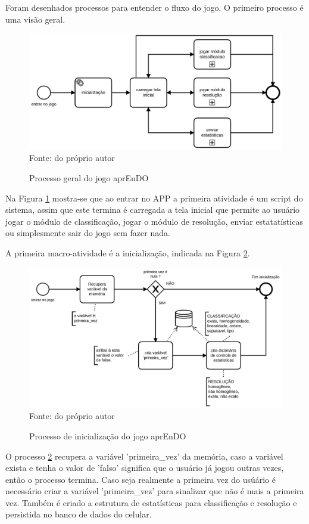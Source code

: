 Foram desenhados processos para entender o fluxo do jogo. O primeiro processo é uma visão geral.

\begin{figure}[H]
\centering
\caption{Processo geral do jogo aprEnDO}
\includegraphics[scale=0.2]{figuras/processos/processo_geral.png}
\label{pg}
\\
\small{Fonte: do próprio autor}
\end{figure}

Na Figura \ref{pg} mostra-se que ao entrar no APP a primeira atividade é um script do sistema, assim que este termina é carregada a tela inicial que permite ao usuário jogar o módulo de classificação, jogar o módulo de resolução, enviar estatatísticas ou simplesmente sair do jogo sem fazer nada.

A primeira macro-atividade é a inicialização, indicada na Figura \ref{inic}.

\begin{figure}[H]
\centering
\caption{Processo de inicialização do jogo aprEnDO}
\includegraphics[scale=0.2]{figuras/processos/proccesso_inicializacao.png}
\label{inic}
\small{Fonte: do próprio autor}
\end{figure}

O processo \ref{inic} recupera a variável 'primeira\_vez' da memória, caso a variável exista e tenha o valor de 'falso' significa que o usuário já jogou outras vezes, então o processo termina. Caso seja realmente a primeira vez do usúário é necessário criar a variável 'primeira\_vez' para sinalizar que não é mais a primeira vez. Também é criado a estrutura de estatísticas para classificação e resolução e persistida no banco de dados do celular.

